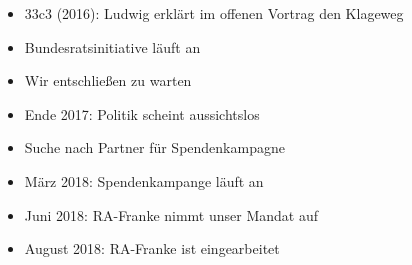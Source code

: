 \begin{frame}
    \begin{itemize}
        \item 33c3 (2016): Ludwig erklärt im offenen Vortrag den Klageweg
        \item Bundesratsinitiative läuft an
        \item Wir entschließen zu warten
        \item Ende 2017: Politik scheint aussichtslos
        \item Suche nach Partner für Spendenkampagne
        \item März 2018: Spendenkampange läuft an
        \item Juni 2018: RA-Franke nimmt unser Mandat auf
        \item August 2018: RA-Franke ist eingearbeitet
    \end{itemize}
\end{frame}


